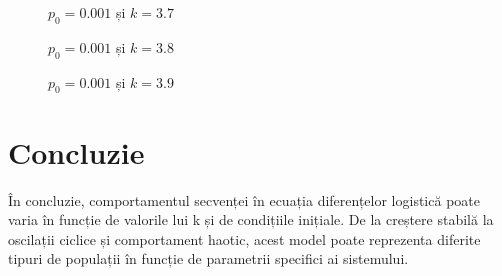 \documentclass[a4paper,12pt]{article}
\begin{document}
\begin{figure}[h!]
\centering
{}
\caption{$p_0 = 0.001$ și $k=3.7$}
\end{figure}


\begin{figure}[h!]
\centering
{}
\caption{$p_0 = 0.001$ și $k=3.8$}
\end{figure}


\begin{figure}[h!]
\centering
{}
\caption{$p_0 = 0.001$ și $k=3.9$}
\end{figure}


\section{Concluzie}
În concluzie, comportamentul secvenței în ecuația diferențelor logistică poate varia în funcție de valorile lui k și de condițiile inițiale. De la creștere stabilă la oscilații ciclice și comportament haotic, acest model poate reprezenta diferite tipuri de populații în funcție de parametrii specifici ai sistemului.
\end{document}
